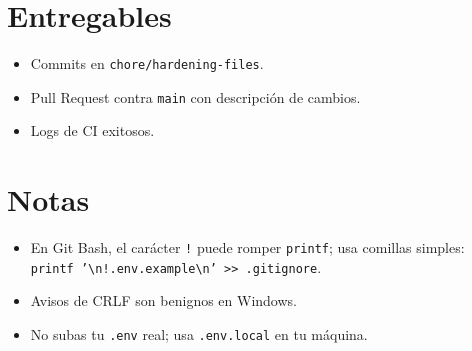\documentclass[11pt]{article}
\begin{document}
\section*{Entregables}
\begin{itemize}[leftmargin=*]
  \item Commits en \texttt{chore/hardening-files}.
  \item Pull Request contra \texttt{main} con descripción de cambios.
  \item Logs de CI exitosos.
\end{itemize}

\section*{Notas}
\begin{itemize}[leftmargin=*]
  \item En Git Bash, el carácter \texttt{!} puede romper \texttt{printf}; usa comillas simples: \texttt{printf '\textbackslash n!.env.example\textbackslash n' >> .gitignore}.
  \item Avisos de CRLF son benignos en Windows.
  \item No subas tu \texttt{.env} real; usa \texttt{.env.local} en tu máquina.
\end{itemize}
\end{document}

